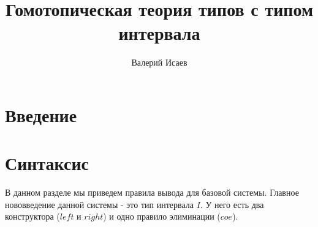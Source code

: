 \documentclass{amsart}
\theoremstyle{definition}
\theoremstyle{remark}
\numberwithin{figure}{section}
\begin{document}
\makeatletter
\def\@settitle{\begin{center}%
    \baselineskip14\p@\relax
    \bfseries
    \@title
  \end{center}%
}

\title{Гомотопическая теория типов с типом интервала}

\author{Валерий Исаев}


\maketitle

\section{Введение}

\section{Синтаксис}

В данном разделе мы приведем правила вывода для базовой системы.
Главное нововведение данной системы - это тип интервала $I$.
У него есть два конструктора ($left$ и $right$) и одно правило элиминации ($coe$).

\centerAlignProof
\end{document}
